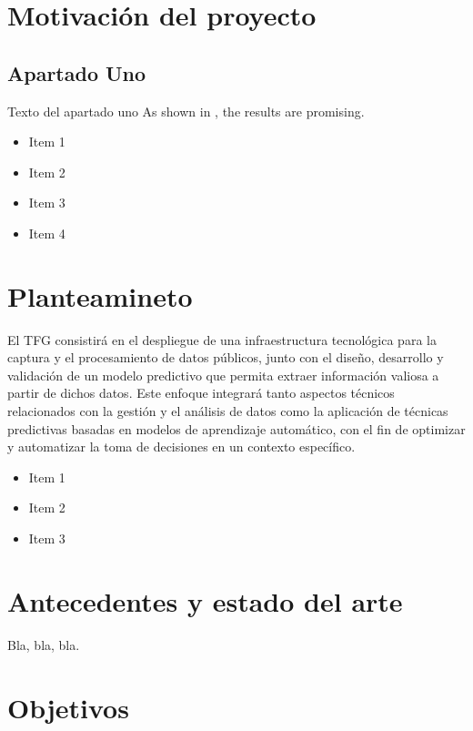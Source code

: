 \section{Motivación del proyecto}
\subsection{Apartado Uno}
\begin{large}
Texto del apartado uno
As shown in \cite{smith2023}, the results are promising.

\begin{itemize}
   \item Item 1
   \item Item 2
   \item Item 3
   \item Item 4
\end{itemize}
\end{large}

\section{Planteamineto}
El TFG consistirá en el despliegue de una infraestructura tecnológica para la captura y el procesamiento de datos públicos, 
junto con el diseño, desarrollo y validación de un modelo predictivo que permita extraer información valiosa a partir de dichos datos.
 Este enfoque integrará tanto aspectos técnicos relacionados con la gestión y el análisis de datos como la aplicación de técnicas predictivas
  basadas en modelos de aprendizaje automático, con el fin de optimizar y automatizar la toma de decisiones en un contexto específico.
\begin{large}
\begin{itemize}
   \item Item 1
   \item Item 2
   \item Item 3
\end{itemize}
\end{large}

\section{Antecedentes y estado del arte}

\begin{large}
Bla, bla, bla.
\end{large}

\section{Objetivos}

